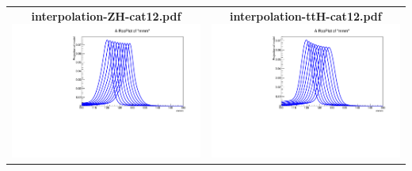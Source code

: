 \begin{longtable}{|c|c|}
{}
 \\
\hline
\parbox{0.49\textwidth}{
\centering
{\bfseries interpolation-ZH-cat12.pdf}
\includegraphics[width=.49\textwidth]{figures/signal_model/AppendixBdt/interpolation_ZH_cat12.pdf}
}
 & \parbox{0.49\textwidth}{
\centering
{\bfseries interpolation-ttH-cat12.pdf}
\includegraphics[width=.49\textwidth]{figures/signal_model/AppendixBdt/interpolation_ttH_cat12.pdf}
}
 \\
\hline
\end{longtable}

